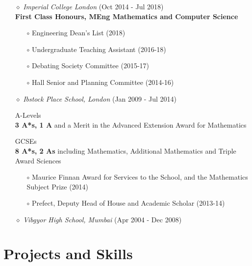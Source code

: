 \documentclass[a4paper]{article}
\begin{document}
\begin{itemize}

\item[$\diamond$] \textit{Imperial College London} (Oct 2014 - Jul 2018)	\\
	\textbf{First Class Honours, MEng Mathematics and Computer Science}
\begin{itemize}
\item[$\circ$] Engineering Dean's List (2018)
\item[$\circ$] Undergraduate Teaching Assistant (2016-18)
\item[$\circ$] Debating Society Committee (2015-17)
\item[$\circ$] Hall Senior and Planning Committee (2014-16)
\end{itemize}

\item[$\diamond$] \textit{Ibstock Place School, London} (Jan 2009 - Jul 2014)

A-Levels \\
\textbf{3 A*s, 1 A} and a Merit in the Advanced Extension Award for Mathematics

GCSEs \\
\textbf{8 A*s, 2 As} including Mathematics, Additional Mathematics and Triple Award Sciences
	
\begin{itemize}
\item[$\circ$] Maurice Finnan Award for Services to the School, and the Mathematics Subject Prize (2014)
\item[$\circ$] Prefect, Deputy Head of House and Academic Scholar (2013-14)
\end{itemize}	

\item[$\diamond$] \textit{Vibgyor High School, Mumbai} (Apr 2004 - Dec 2008)

\end{itemize}

\vspace{-10pt}
\section*{Projects and Skills}
\vspace{-7pt}
\end{document}
